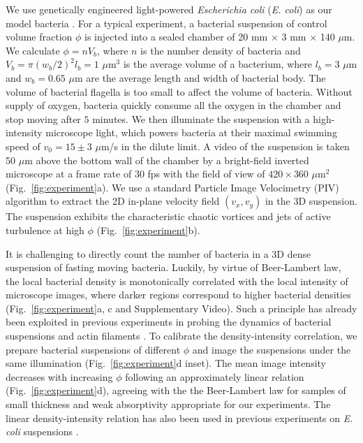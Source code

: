 \documentclass[twocolumn,aps,prx,amsmath,amssymb,longbibliography]{revtex4-2}
\begin{document}
We use genetically engineered light-powered \textit{Escherichia coli} (\textit{E. coli}) as our model bacteria \cite{Liu2020}.
For a typical experiment, a bacterial suspension of control volume fraction $\phi$ is injected into a sealed chamber of 20 mm $\times$ 3 mm $\times$ 140 $\mu$m. We calculate $\phi = n V_b$, where $n$ is the number density of bacteria and $V_b = \pi (w_b/2)^2 l_b = 1$ $\mu$m$^3$ is the average volume of a bacterium, where $l_b = 3$ $\mu$m and $w_b = 0.65$ $\mu$m are the average length and width of bacterial body. The volume of bacterial flagella is too small to affect the volume of bacteria.
Without supply of oxygen, bacteria quickly consume all the oxygen in the chamber and stop moving after $5$ minutes.
We then illuminate the suspension with a high-intensity microscope light, which powers bacteria at their maximal swimming speed of $v_0 = 15 \pm 3$ $\mu$m/s in the dilute limit.
A video of the suspension is taken 50 $\mu$m above the bottom wall of the chamber by a bright-field inverted microscope at a frame rate of $30$ fps with the field of view of $420 \times 360$ $\mu$m$^2$ (Fig.~\ref{fig:experiment}a).
We use a standard Particle Image Velocimetry (PIV) algorithm \cite{Liberzon2020} %
to extract the 2D in-plane velocity field $(v_x,v_y)$ in the 3D suspension. The suspension exhibits the characteristic chaotic vortices and jets of active turbulence at high $\phi$ (Fig.~\ref{fig:experiment}b).

It is challenging to directly count the number of bacteria in a 3D dense suspension of fasting moving bacteria. Luckily, by virtue of Beer-Lambert law, the local bacterial density is monotonically correlated with the local intensity of microscope images, where darker regions correspond to higher bacterial densities (Fig.~\ref{fig:experiment}a, c and Supplementary Video). Such a principle has already been exploited in previous experiments in probing the dynamics of bacterial suspensions and actin filaments \cite{Sokolov2009, Wilson2011, Schaller2013}. To calibrate the density-intensity correlation, we prepare bacterial suspensions of different $\phi$ and image the suspensions under the same illumination (Fig.~\ref{fig:experiment}d inset). The mean image intensity decreases with increasing $\phi$ following an approximately linear relation (Fig.~\ref{fig:experiment}d), agreeing with the the Beer-Lambert law for samples of small thickness and weak absorptivity appropriate for our experiments. The linear density-intensity relation has also been used in previous experiments on \textit{E. coli} suspensions \cite{Wilson2011}.
\end{document}
